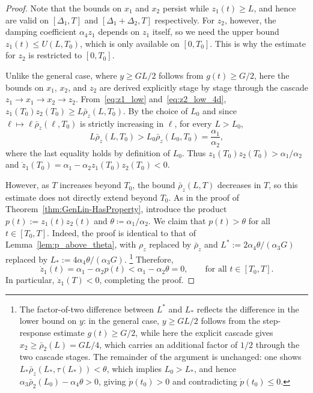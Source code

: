 \documentclass{article}
\begin{document}
\begin{proof}
Note that the bounds on $x_1$ and $x_2$ persist while $z_1(t)\ge L$, and 
hence are valid on $[\Delta_1,T]$ and $[\Delta_1+\Delta_2,T]$ respectively. 
For $z_2$, however, the damping coefficient $\alpha_4 z_1$ depends on $z_1$ 
itself, so we need the upper bound $z_1(t)\le U(L,T_0)$, which is only 
available on $[0,T_0]$. This is why the estimate for $z_2$ is restricted 
to $[0,T_0]$.

Unlike the general case, where $y\ge GL/2$ follows from $g(t)\ge G/2$, 
here the bounds on $x_1$, $x_2$, and $z_2$ are derived explicitly stage 
by stage through the cascade $z_1\to x_1\to x_2\to z_2$. 
From~\eqref{eq:z1_low} and~\eqref{eq:z2_low_4d}, 
$z_1(T_0)z_2(T_0)\ge L\bar\rho_z(L,T_0)$.
By the choice of $L_0$ and since $\ell\mapsto\ell\bar\rho_z(\ell,T_0)$ 
is strictly increasing in $\ell$, for every 
$L>L_0$,
\begin{equation*}
    L\bar\rho_z(L,T_0) > L_0\bar\rho_z(L_0,T_0) = \frac{\alpha_1}{\alpha_2},
\end{equation*}
where the last equality holds by definition of $L_0$. Thus
$z_1(T_0)z_2(T_0)>\alpha_1/\alpha_2$ and 
$\dot z_1(T_0)=\alpha_1-\alpha_2 z_1(T_0)z_2(T_0)<0$.

However, as $T$ increases beyond $T_0$, the bound $\bar\rho_z(L,T)$
decreases in $T$, so this estimate does not directly extend beyond $T_0$.
As in the proof of Theorem~\ref{thm:GenLin-HasProperty}, introduce the product
$p(t):=z_1(t)z_2(t)$ and $\theta\coloneqq\alpha_1/\alpha_2$.
We claim that $p(t)>\theta$ for all $t\in[T_0,T]$.
Indeed, the proof is identical to that of Lemma~\ref{lem:p_above_theta}, with
$\rho_z$ replaced by $\bar\rho_z$ and
$L^*:=2\alpha_4\theta/(\alpha_3G)$ replaced by
$L_*:=4\alpha_4\theta/(\alpha_3G)$.
    \footnote{The factor-of-two difference 
    between $L^*$ and $L_*$ reflects the difference in the lower bound on $y$: 
    in the general case, $y\ge GL/2$ follows from the step-response estimate 
    $g(t)\ge G/2$, while here the explicit cascade gives 
    $x_2\ge\bar\rho_2(L)=GL/4$, 
    which carries an additional factor of $1/2$ through the two cascade stages. 
    The remainder of the argument is unchanged: one shows 
    $L_*\bar\rho_{z}(L_*,\tau(L_*))<\theta$, which implies $L_0>L_*$, and 
    hence $\alpha_3\bar\rho_2(L_0)-\alpha_4\theta>0$, giving 
    $\dot p(t_0)>0$ and contradicting $\dot p(t_0)\le 0$.}
Therefore,
\begin{equation*}
    \dot z_1(t) = \alpha_1-\alpha_2 p(t) < \alpha_1-\alpha_2\theta = 0,
    \qquad\text{for all } t\in[T_0,T].
\end{equation*}
In particular, $\dot z_1(T)<0$, completing the proof.
\end{proof}
\end{document}

